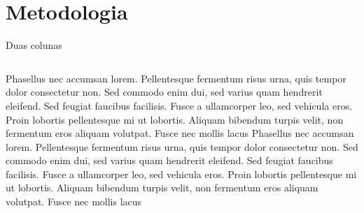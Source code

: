 \documentclass[17pt, c]{beamer}
\begin{document}
\section{Metodologia}
\insertsectionpage
\begin{frame}{Duas colunas}
\begin{columns}
		Phasellus nec accumsan lorem. Pellentesque fermentum risus urna, quis tempor dolor consectetur non. Sed commodo enim dui, sed varius quam hendrerit eleifend. Sed feugiat faucibus facilisis. Fusce a ullamcorper leo, sed vehicula eros. Proin lobortis pellentesque mi ut lobortis. Aliquam bibendum turpis velit, non fermentum eros aliquam volutpat. Fusce nec mollis lacus
		Phasellus nec accumsan lorem. Pellentesque fermentum risus urna, quis tempor dolor consectetur non. Sed commodo enim dui, sed varius quam hendrerit eleifend. Sed feugiat faucibus facilisis. Fusce a ullamcorper leo, sed vehicula eros. Proin lobortis pellentesque mi ut lobortis. Aliquam bibendum turpis velit, non fermentum eros aliquam volutpat. Fusce nec mollis lacus
\end{columns}
\end{frame}
\end{document}
